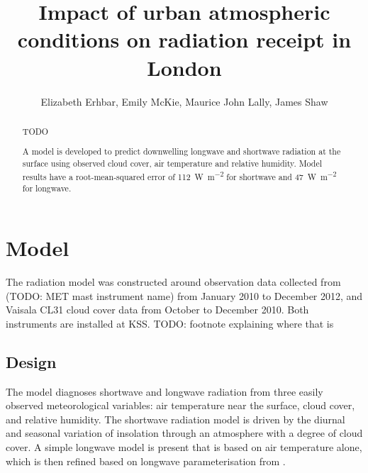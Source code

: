 \documentclass[a4paper,titlepage, twoside]{report}
\begin{document}
\title{Impact of urban atmospheric conditions on radiation receipt in London}
\author{Elizabeth Erhbar, Emily McKie, Maurice John Lally, James Shaw}
\maketitle

\begin{abstract}
TODO

A model is developed to predict downwelling longwave and shortwave radiation at the surface using observed cloud cover, air temperature and relative humidity.  Model results have a root-mean-squared error of \SI{112}{\watt\per\meter\squared} for shortwave and \SI{47}{\watt\per\meter\squared} for longwave.
\end{abstract}

\chapter{Model}
The radiation model was constructed around observation data collected from (TODO: MET mast instrument name) from January 2010 to December 2012, and Vaisala CL31 cloud cover data from October to December 2010.  Both instruments are installed at KSS. TODO: footnote explaining where that is

\section{Design}
The model diagnoses shortwave and longwave radiation from three easily observed meteorological variables: air temperature near the surface, cloud cover, and relative humidity.  The shortwave radiation model is driven by the diurnal and seasonal variation of insolation through an atmosphere with a degree of cloud cover.  A simple longwave model is present that is based on air temperature alone, which is then refined based on longwave parameterisation from \cite{loridan}.
\end{document}
